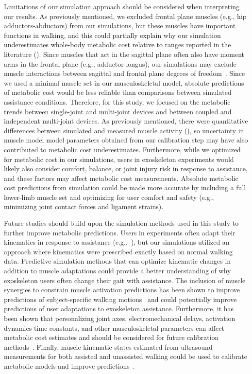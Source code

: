 \documentclass[10pt,letterpaper]{article}
\begin{document}
Limitations of our simulation approach should be considered when interpreting our results. As previously mentioned, we excluded frontal plane muscles (e.g., hip adductors-abductors) from our simulations, but these muscles have important functions in walking, and this could partially explain why our simulation underestimates whole-body metabolic cost relative to ranges reported in the literature (). Since muscles that act in the sagittal plane often also have moment arms in the frontal plane (e.g., adductor longus), our simulations may exclude muscle interactions between sagittal and frontal plane degrees of freedom~\cite{Dembia:2017}. Since we used a minimal muscle set in our musculoskeletal model, absolute predictions of metabolic cost would be less reliable than comparisons between simulated assistance conditions. Therefore, for this study, we focused on the metabolic trends between single-joint and multi-joint devices and between coupled and independent multi-joint devices. As previously mentioned, there were quantitative differences between simulated and measured muscle activity (), so uncertainty in muscle model model parameters obtained from our calibration step may have also contributed to metabolic cost underestimates. Furthermore, while we optimized for metabolic cost in our simulations, users in exoskeleton experiments would likely also consider comfort, balance, or joint injury risk in response to assistance, and these factors may affect metabolic cost measurements. Absolute metabolic cost predictions from simulation could be made more accurate by including a full lower-limb muscle set and optimizing for user comfort and safety (e.g., minimizing joint contact forces and ligament strains).

Future studies should build upon the simulation methods used in this study to further improve metabolic predictions. Users in experiments often adapt their kinematics in response to assistance (e.g.,~\cite{Gordon:2018, Collins:2015, Quinlivan:2017, Lee:2017, Panizzolo:2016, Jackson:2015, Galle:2017, Koller:2015}), but our simulations utilized an approach where kinematics were prescribed exactly based on normal walking data. Predictive simulation methods that can optimize kinematic changes in addition to muscle adaptations could provide a better understanding of why exoskeleton users often change their gait with assistance. The inclusion of muscle synergies to constrain muscle activation predictions has been shown to improve predictions of subject-specific walking motions~\cite{Meyer:2016} and could potentially improve predictions of user adaptations to exoskeleton assistance. Furthermore, it has been shown that personalizing joint axes, electromechanical delays, activation dynamics time constants, and other musculoskeletal  parameters can affect metabolic cost estimates and should be considered for future calibration methods~\cite{Arones:2020}. Finally, muscle kinematic states estimated from ultrasound measurements for both assisted and unassisted walking could be used to calibrate metabolic models and improve predictions~\cite{Nuckols:2020}.
\end{document}
